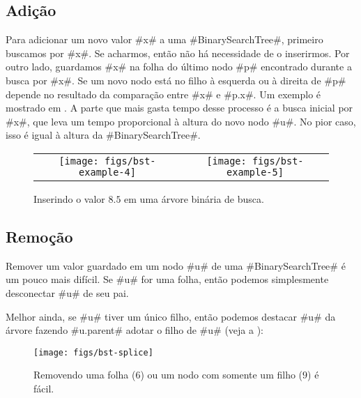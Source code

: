 \subsection{Adição}

Para adicionar um novo valor #x# a uma 
#BinarySearchTree#, primeiro buscamos por #x#. 
Se acharmos, então não há necessidade de o inserirmos. Por outro lado,
guardamos #x# na folha do último nodo #p# encontrado durante a busca
por #x#. Se um novo nodo está no filho à esquerda ou à direita de #p# depende
no resultado da comparação entre 
 #x# e #p.x#.
Um exemplo é mostrado em 
. A parte que mais gasta tempo desse processo é a busca inicial por #x#, que leva um tempo proporcional à altura do novo nodo #u#.
No pior caso, isso é igual à altura da #BinarySearchTree#.


\begin{figure}
  \begin{center}
    \begin{tabular}{cc}
    \texttt{[image: figs/bst-example-4]} &
    \texttt{[image: figs/bst-example-5]} 
    \end{tabular}
  \end{center}
  \caption{Inserindo o valor $8.5$ em uma árvore binária de busca.} 
\end{figure}


\subsection{Remoção}

Remover um valor guardado em um nodo #u# de uma
#BinarySearchTree# é um pouco mais difícil. 
Se #u# for uma folha, então podemos simplesmente desconectar #u# de seu pai.

Melhor ainda, se #u# tiver um único filho, então podemos destacar #u#
da árvore fazendo 
#u.parent# adotar o filho de #u# (veja a
):

\begin{figure}
  \begin{center}
    \texttt{[image: figs/bst-splice]}
  \end{center}
  \caption{Removendo uma folha ($6$) ou um nodo com somente um filho ($9$) é fácil.}
\end{figure}

